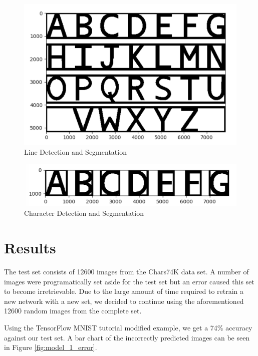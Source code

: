 \documentclass[11pt]{article}
\begin{document}
    \begin{figure}
        \centering
        \includegraphics[scale=0.4]{line_segmentation_example.png}
        \caption{Line Detection and Segmentation}
        \label{fig:line_segmentation}
    \end{figure}   
    
    \begin{figure}
        \centering
        \includegraphics[scale=0.4]{character_segmentation_example.png}
        \caption{Character Detection and Segmentation}
        \label{fig:character_segmentation}
    \end{figure}

\section{Results}

The test set consists of 12600 images from the Chars74K data set. A number of images were programatically set aside for the test set but an error caused this set to become irretrievable. Due to the large amount of time required to retrain a new network with a new set, we decided to continue using the aforementioned 12600 random images from the complete set.

Using the TensorFlow MNIST tutorial modified example, we get a 74\% accuracy against our test set. A bar chart of the incorrectly predicted images can be seen in Figure \ref{fig:model_1_error}.
\end{document}
